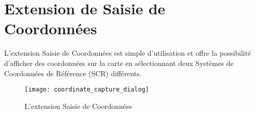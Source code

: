 
\section{Extension de Saisie de Coordonnées}


L'extension Saisie de Coordonnées est simple d'utilisation et offre la
possibilité d'afficher des coordonnées sur la carte en sélectionnant deux
Systèmes de Coordonnées de Référence (SCR) différents.

\begin{figure}[ht]
   \begin{center}
   \texttt{[image: coordinate\_capture\_dialog]}
   \caption{L'extension Saisie de Coordonnées \nixcaption}\label{fig:coordinate_capture_dialog}
   \end{center} 
\end{figure}


